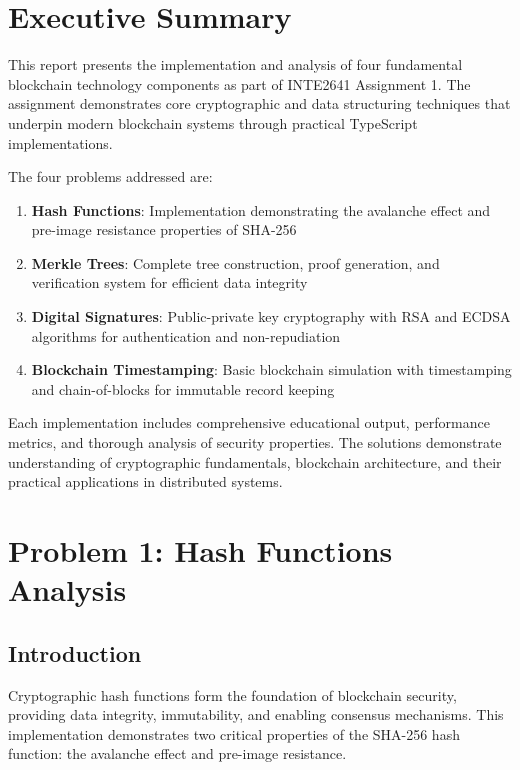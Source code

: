 \documentclass[12pt,a4paper]{article}
\begin{document}
\tableofcontents
\newpage

\section{Executive Summary}

This report presents the implementation and analysis of four fundamental blockchain technology components as part of INTE2641 Assignment 1. The assignment demonstrates core cryptographic and data structuring techniques that underpin modern blockchain systems through practical TypeScript implementations.

The four problems addressed are:
\begin{enumerate}
    \item \textbf{Hash Functions}: Implementation demonstrating the avalanche effect and pre-image resistance properties of SHA-256
    \item \textbf{Merkle Trees}: Complete tree construction, proof generation, and verification system for efficient data integrity
    \item \textbf{Digital Signatures}: Public-private key cryptography with RSA and ECDSA algorithms for authentication and non-repudiation
    \item \textbf{Blockchain Timestamping}: Basic blockchain simulation with timestamping and chain-of-blocks for immutable record keeping
\end{enumerate}

Each implementation includes comprehensive educational output, performance metrics, and thorough analysis of security properties. The solutions demonstrate understanding of cryptographic fundamentals, blockchain architecture, and their practical applications in distributed systems.

\section{Problem 1: Hash Functions Analysis}

\subsection{Introduction}

Cryptographic hash functions form the foundation of blockchain security, providing data integrity, immutability, and enabling consensus mechanisms. This implementation demonstrates two critical properties of the SHA-256 hash function: the avalanche effect and pre-image resistance.
\end{document}
